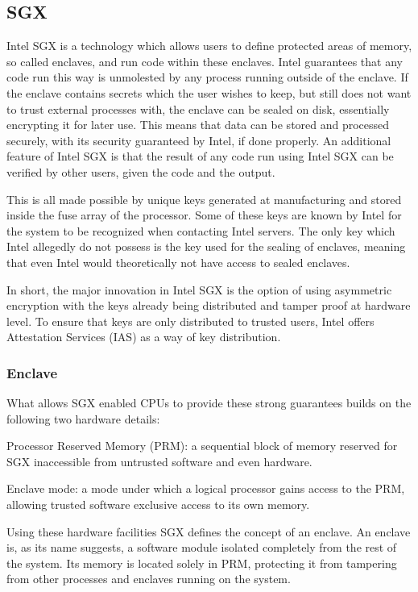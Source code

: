 \documentclass[12pt]{article}
\begin{document}
		\subsection{SGX}
		Intel SGX is a technology which allows users to define protected areas of memory, so called enclaves, and run code within these enclaves.
		Intel guarantees that any code run this way is unmolested by any process running outside of the enclave.
		If the enclave contains secrets which the user wishes to keep, but still does not want to trust external processes with, the enclave can be sealed on disk, essentially encrypting it for later use.
		This means that data can be stored and processed securely, with its security guaranteed by Intel, if done properly.
		An additional feature of Intel SGX is that the result of any code run using Intel SGX can be verified by other users, given the code and the output.

		This is all made possible by unique keys generated at manufacturing and stored inside the fuse array of the processor.
		Some of these keys are known by Intel for the system to be recognized when contacting Intel servers.
		The only key which Intel allegedly do not possess is the key used for the sealing of enclaves, meaning that even Intel would theoretically not have access to sealed enclaves.

		In short, the major innovation in Intel SGX is the option of using asymmetric encryption with the keys already being distributed and tamper proof at hardware level.
		To ensure that keys are only distributed to trusted users, Intel offers Attestation Services (IAS) as a way of key distribution.

      \subsubsection{Enclave}
      What allows SGX enabled CPUs to provide these strong guarantees builds on the following two hardware details:
      \begin{description}
        \item Processor Reserved Memory (PRM): a sequential block of memory reserved for SGX inaccessible from untrusted software and even hardware.
        \item Enclave mode: a mode under which a logical processor gains access to the PRM, allowing trusted software exclusive access to its own memory.
      \end{description}
      Using these hardware facilities SGX defines the concept of an enclave.
      An enclave is, as its name suggests, a software module isolated completely from the rest of the system.
      Its memory is located solely in PRM, protecting it from tampering from other processes and enclaves running on the system.
\end{document}
